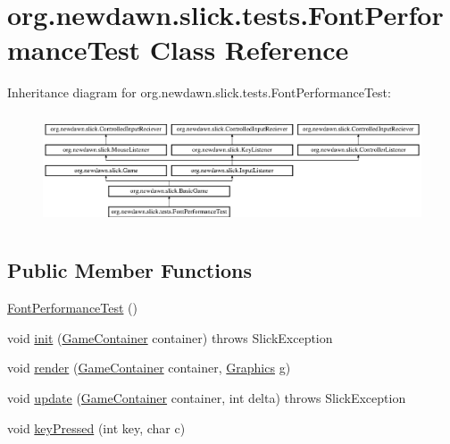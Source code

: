 \hypertarget{classorg_1_1newdawn_1_1slick_1_1tests_1_1_font_performance_test}{}\section{org.\+newdawn.\+slick.\+tests.\+Font\+Performance\+Test Class Reference}
\label{classorg_1_1newdawn_1_1slick_1_1tests_1_1_font_performance_test}
Inheritance diagram for org.\+newdawn.\+slick.\+tests.\+Font\+Performance\+Test\+:\begin{figure}[H]
\begin{center}
\leavevmode
\includegraphics[height=3.345281cm]{classorg_1_1newdawn_1_1slick_1_1tests_1_1_font_performance_test}
\end{center}
\end{figure}
\subsection*{Public Member Functions}
\begin{DoxyCompactItemize}
\item 
\mbox{\hyperlink{classorg_1_1newdawn_1_1slick_1_1tests_1_1_font_performance_test_aba85d0da47806a79a5e11159d80d0382}{Font\+Performance\+Test}} ()
\item 
void \mbox{\hyperlink{classorg_1_1newdawn_1_1slick_1_1tests_1_1_font_performance_test_a4f223f0be65386afa1fc509943cbd985}{init}} (\mbox{\hyperlink{classorg_1_1newdawn_1_1slick_1_1_game_container}{Game\+Container}} container)  throws Slick\+Exception 
\item 
void \mbox{\hyperlink{classorg_1_1newdawn_1_1slick_1_1tests_1_1_font_performance_test_a7014f0e38f13f774eee098cd46187b5f}{render}} (\mbox{\hyperlink{classorg_1_1newdawn_1_1slick_1_1_game_container}{Game\+Container}} container, \mbox{\hyperlink{classorg_1_1newdawn_1_1slick_1_1_graphics}{Graphics}} g)
\item 
void \mbox{\hyperlink{classorg_1_1newdawn_1_1slick_1_1tests_1_1_font_performance_test_a6222f635b58438e8a44da6947182eb59}{update}} (\mbox{\hyperlink{classorg_1_1newdawn_1_1slick_1_1_game_container}{Game\+Container}} container, int delta)  throws Slick\+Exception 
\item 
void \mbox{\hyperlink{classorg_1_1newdawn_1_1slick_1_1tests_1_1_font_performance_test_adf4c0f4b3f99963f3fc7ef3756c52100}{key\+Pressed}} (int key, char c)
\end{DoxyCompactItemize}
